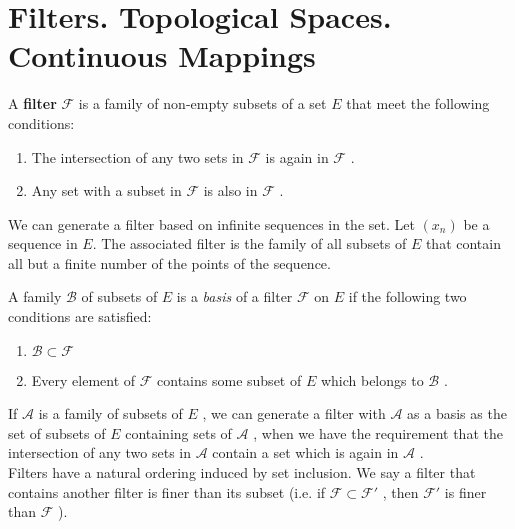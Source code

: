 \section{Filters. Topological Spaces. Continuous Mappings}

\begin{defn}
	A \textbf{filter} $ \mathcal{F} $  is a family of non-empty subsets of a set $ E $ that meet the following conditions:
	\begin{enumerate}
		\item The intersection of any two sets in $ \mathcal{F} $  is again in $ \mathcal{F} $ .
		\item Any set with a subset in $ \mathcal{F} $ is also in $ \mathcal{F} $ .
	\end{enumerate}

	
\end{defn}


We can generate a filter based on infinite sequences in the set. Let $ ( x_{ n } ) $ be a sequence in $ E $. The associated filter is the family of all subsets of $ E $ that contain all but a finite number of the points of the sequence.

\begin{defn}
	A family $ \mathcal{B} $ of subsets of $ E $ is a \textit{basis} of a filter $ \mathcal{F} $ on $ E $ if the following two conditions are satisfied:

	\begin{enumerate}
		\item $ \mathcal{B} \subset \mathcal{F} $ 
		\item Every element of $ \mathcal{F} $ contains some subset of $ E $ which belongs to $ \mathcal{B} $ .
	\end{enumerate}

\end{defn}

If $ \mathcal{A} $ is a family of subsets of $ E $ , we can generate a filter with $ \mathcal{A} $ as a basis as the set of subsets of $ E $ containing sets of $ \mathcal{A} $ , when we have the requirement that the intersection of any two sets in $ \mathcal{A} $ contain a set which is again in $ \mathcal{A} $ . \\

Filters have a natural ordering induced by set inclusion. We say a filter that contains another filter is finer than its subset (i.e. if $ \mathcal{F} \subset \mathcal{F}' $ , then $ \mathcal{F}' $ is finer than $ \mathcal{F} $ ). \\

